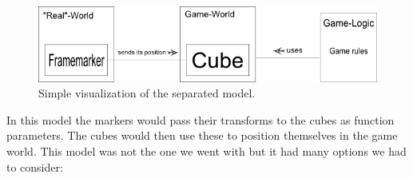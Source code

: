 \begin{figure}[ht] 
        \capstart
        \centering  
        \includegraphics[width=\textwidth]{images/complexCubeMarkerModel.png}    
        \caption[Separated Cube-Marker model]{Simple visualization of the separated model.} 
        \label{fig:complex_cube_marker_model} 
\end{figure}

In this model the markers would pass their transforms to the cubes as function parameters. 
The cubes would then use these to position themselves in the game world. 
This model was not the one we went with but it had many options we had to consider:
